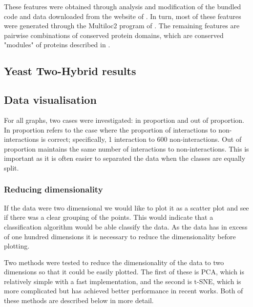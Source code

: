 These features were obtained through analysis and modification of the bundled code and data downloaded from the website of \textcite{rodgers-melnick_predicting_2013}.
In turn, most of these features were generated through the Multiloc2 program of \textcite{blum_multiloc2:_2009}.
The remaining features are pairwise combinations of conserved protein domains, which are conserved "modules" of proteins described in \textcite{janin_domains_1985}.

\subsection{Yeast Two-Hybrid results}
\label{y2h}



\subsection{Data visualisation}
\label{dataviz}

For all graphs, two cases were investigated: in proportion and out of proportion.
In proportion refers to the case where the proportion of interactions to non-interactions is correct; specifically, 1 interaction to 600 non-interactions.
Out of proportion maintains the same number of interactions to non-interactions.
This is important as it is often easier to separated the data when the classes are equally split.

\subsubsection{Reducing dimensionality}
If the data were two dimensional we would like to plot it as a scatter plot and see if there was a clear grouping of the points.
This would indicate that a classification algorithm would be able classify the data.
As the data has in excess of one hundred dimensions it is necessary to reduce the dimensionality before plotting.

Two methods were tested to reduce the dimensionality of the data to two dimensions so that it could be easily plotted.
The first of these is PCA, which is relatively simple with a fast implementation, and the second is t-SNE, which is more complicated but has achieved better performance in recent works.
Both of these methods are described below in more detail.

